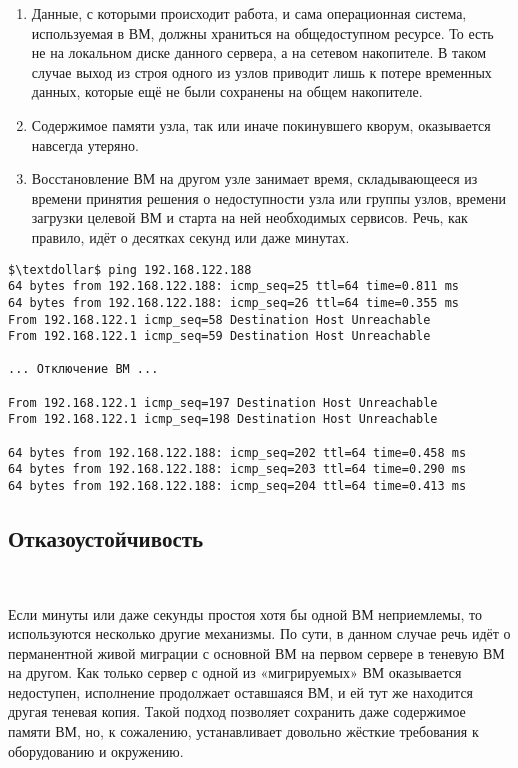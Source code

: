 \documentclass[14pt, a4paper]{article}
\begin{document}
\begin{enumerate}
    \item Данные, с которыми происходит работа, и сама операционная система, используемая в ВМ,
    должны храниться на общедоступном ресурсе. То есть не на локальном диске данного
    сервера, а на сетевом накопителе. В таком случае выход из строя одного из узлов приводит
    лишь к потере временных данных, которые ещё не были сохранены на общем накопителе.
    \item Содержимое памяти узла, так или иначе покинувшего кворум, оказывается навсегда утеряно.
    \item Восстановление ВМ на другом узле занимает время, складывающееся из времени принятия
    решения о недоступности узла или группы узлов, времени загрузки целевой ВМ и старта на
    ней необходимых сервисов. Речь, как правило, идёт о десятках секунд или даже минутах.
\end{enumerate}

\begin{lstlisting}
$\textdollar$ ping 192.168.122.188
64 bytes from 192.168.122.188: icmp_seq=25 ttl=64 time=0.811 ms
64 bytes from 192.168.122.188: icmp_seq=26 ttl=64 time=0.355 ms
From 192.168.122.1 icmp_seq=58 Destination Host Unreachable
From 192.168.122.1 icmp_seq=59 Destination Host Unreachable

... Отключение ВМ ...

From 192.168.122.1 icmp_seq=197 Destination Host Unreachable
From 192.168.122.1 icmp_seq=198 Destination Host Unreachable

64 bytes from 192.168.122.188: icmp_seq=202 ttl=64 time=0.458 ms
64 bytes from 192.168.122.188: icmp_seq=203 ttl=64 time=0.290 ms
64 bytes from 192.168.122.188: icmp_seq=204 ttl=64 time=0.413 ms
\end{lstlisting}

\subsection*{Отказоустойчивость} 

\begin{figure}[h]
    \centering
    \\  
    \label{framework} 
\end{figure}

Если минуты или даже секунды простоя хотя бы одной ВМ неприемлемы, то используются несколько
другие механизмы. По сути, в данном случае речь идёт о перманентной живой миграции с основной
ВМ на первом сервере в теневую ВМ на другом. Как только сервер с одной из «мигрируемых» ВМ
оказывается недоступен, исполнение продолжает оставшаяся ВМ, и ей тут же находится другая
теневая копия. Такой подход позволяет сохранить даже содержимое памяти ВМ, но, к сожалению,
устанавливает довольно жёсткие требования к оборудованию и окружению.\\
\end{document}
